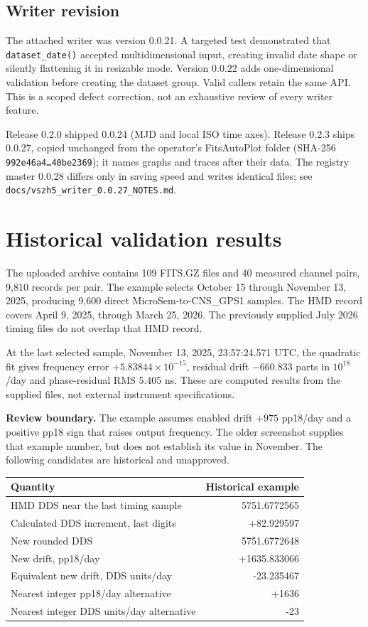 \documentclass[11pt,a4paper]{article}
\newcommand{\warning}[1]{\par\noindent\colorbox{light}{\parbox{\dimexpr\linewidth-2\fboxsep}{\textbf{Review boundary.} #1}}\par}
\begin{document}
\subsection{Writer revision}
The attached writer was version 0.0.21. A targeted test demonstrated that
\texttt{dataset\_date()} accepted multidimensional input, creating invalid
date shape or silently flattening it in resizable mode. Version 0.0.22 adds
one-dimensional validation before creating the dataset group. Valid callers
retain the same API. This is a scoped defect correction, not an exhaustive
review of every writer feature.

Release 0.2.0 shipped 0.0.24 (MJD and local ISO time axes). Release 0.2.3 ships 0.0.27, copied
unchanged from the operator's FitsAutoPlot folder (SHA-256 \texttt{992e46a4\ldots40be2369}); it names
graphs and traces after their data. The registry master 0.0.28 differs only in saving speed and writes
identical files; see \texttt{docs/vszh5\_writer\_0.0.27\_NOTES.md}.
\clearpage

\section{Historical validation results}
The uploaded archive contains 109 FITS.GZ files and 40 measured channel pairs,
9,810 records per pair. The example selects October 15 through November 13,
2025, producing 9,600 direct MicroSem-to-CNS\_GPS1 samples. The HMD record covers
April 9, 2025, through March 25, 2026. The previously supplied July 2026 timing
files do not overlap that HMD record.

At the last selected sample, November 13, 2025, 23:57:24.571 UTC, the quadratic
fit gives frequency error \(+5.83844\times10^{-15}\), residual drift
\(-660.833\) parts in \(10^{18}\)/day and phase-residual RMS 5.405 ns.
These are computed results from the supplied files, not external instrument
specifications.

\warning{The example assumes enabled drift \(+975\) pp18/day and a positive
pp18 sign that raises output frequency. The older screenshot supplies that
example number, but does not establish its value in November. The following
candidates are historical and unapproved.}

\begin{tabular}{@{}p{.49\linewidth}r@{}}
\toprule
Quantity & Historical example\\
\midrule
HMD DDS near the last timing sample & 5751.6772565\\
Calculated DDS increment, last digits & +82.929597\\
New rounded DDS & 5751.6772648\\
New drift, pp18/day & +1635.833066\\
Equivalent new drift, DDS units/day & -23.235467\\
Nearest integer pp18/day alternative & +1636\\
Nearest integer DDS units/day alternative & -23\\
\bottomrule
\end{tabular}
\end{document}

